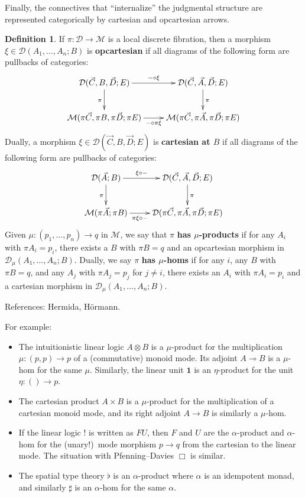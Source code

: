 \documentclass{amsart}
\theoremstyle{definition}
\newtheorem{defn}[thm]{Definition}
\def\M{\mathcal{M}}
\def\D{\mathcal{D}}
\begin{document}
Finally, the connectives that ``internalize'' the judgmental structure are represented categorically by cartesian and opcartesian arrows.

\begin{defn}
  If $\pi:\D\to\M$ is a local discrete fibration, then a morphism $\xi\in\D(A_1,\dots,A_n;B)$ is \textbf{opcartesian} if all diagrams of the following form are pullbacks of categories:
  \[ \xymatrix{
    \D(\vec C,B,\vec D;E) \ar[r]^-{-\circ \xi} \ar[d]_\pi &
    \D(\vec C,\vec A,\vec D;E) \ar[d]^\pi \\
    \M(\pi\vec C,\pi B, \pi\vec D; \pi E) \ar[r]_-{-\circ \pi\xi} &
    \M(\pi\vec C,\pi\vec A,\pi\vec D;\pi E)
  }\]
  Dually, a morphism $\xi\in\D(\vec C,B,\vec D;E)$ is \textbf{cartesian at $B$} if all diagrams of the following form are pullbacks of categories:
  \[ \xymatrix{
    \D(\vec A;B) \ar[r]^-{\xi\circ -} \ar[d]_\pi &
    \D(\vec C,\vec A,\vec D;E) \ar[d]^\pi \\
    \M(\pi\vec A;\pi B) \ar[r]_-{\pi\xi\circ -} &
    \D(\pi\vec C,\pi\vec A,\pi\vec D;\pi E)
  }\]
  Given $\mu:(p_1,\dots,p_n) \to q$ in $\M$, we say that $\pi$ \textbf{has $\mu$-products} if for any $A_i$ with $\pi A_i = p_i$, there exists a $B$ with $\pi B = q$ and an opcartesian morphism in $\D_\mu(A_1,\dots,A_n;B)$.
  Dually, we say $\pi$ \textbf{has $\mu$-homs} if for any $i$, any $B$ with $\pi B = q$, and any $A_j$ with $\pi A_j = p_j$ for $j\neq i$, there exists an $A_i$ with $\pi A_i = p_i$ and a cartesian morphism in $\D_\mu(A_1,\dots,A_n;B)$.
\end{defn}

References: Hermida, H\"{o}rmann.

For example:
\begin{itemize}
\item The intuitionistic linear logic $A \otimes B$ is a $\mu$-product for the multiplication $\mu:(p,p)\to p$ of a (commutative) monoid mode.
  Its adjoint $A\multimap B$ is a $\mu$-hom for the same $\mu$.
  Similarly, the linear unit $\mathbf{1}$ is an $\eta$-product for the unit $\eta :()\to p$.
\item The cartesian product $A\times B$ is a $\mu$-product for the multiplication of a cartesian monoid mode, and its right adjoint $A\to B$ is similarly a $\mu$-hom.
\item If the linear logic $!$ is written as $F U$, then $F$ and $U$ are the $\alpha$-product and $\alpha$-hom for the (unary!)\ mode morphism $p\to q$ from the cartesian to the linear mode.
  The situation with Pfenning--Davies $\Box$ is similar.
\item The spatial type theory $\flat$ is an $\alpha$-product where $\alpha$ is an idempotent monad, and similarly $\sharp$ is an $\alpha$-hom for the same $\alpha$.
\end{itemize}
\end{document}
